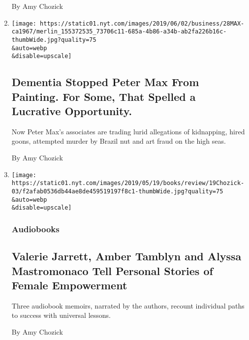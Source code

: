 \begin{enumerate}
  By Amy Chozick
\item
  \href{/2019/05/28/business/peter-max-dementia-cruise-ship-auctions.html}{}

  \texttt{[image: https://static01.nyt.com/images/2019/06/02/business/28MAX-ca1967/merlin\_155372535\_73706c11-685a-4b86-a34b-ab2fa226b16c-thumbWide.jpg?quality=75\\\&auto=webp\\\&disable=upscale]}

  \hypertarget{dementia-stopped-peter-max-from-painting-for-some-that-spelled-a-lucrative-opportunity}{%
  \subsection{Dementia Stopped Peter Max From Painting. For Some, That
  Spelled a Lucrative
  Opportunity.}\label{dementia-stopped-peter-max-from-painting-for-some-that-spelled-a-lucrative-opportunity}}

  Now Peter Max's associates are trading lurid allegations of
  kidnapping, hired goons, attempted murder by Brazil nut and art fraud
  on the high seas.

  By Amy Chozick
\item
  \href{/2019/04/26/books/review/valerie-jarrett-finding-my-voice-audiobook-memoirs.html}{}

  \texttt{[image: https://static01.nyt.com/images/2019/05/19/books/review/19Chozick-03/f2afab0536db44ae8de459519197f8c1-thumbWide.jpg?quality=75\\\&auto=webp\\\&disable=upscale]}

  \hypertarget{audiobooks}{%
  \subsubsection{Audiobooks}\label{audiobooks}}

  \hypertarget{valerie-jarrett-amber-tamblyn-and-alyssa-mastromonaco-tell-personal-stories-of-female-empowerment}{%
  \subsection{Valerie Jarrett, Amber Tamblyn and Alyssa Mastromonaco
  Tell Personal Stories of Female
  Empowerment}\label{valerie-jarrett-amber-tamblyn-and-alyssa-mastromonaco-tell-personal-stories-of-female-empowerment}}

  Three audiobook memoirs, narrated by the authors, recount individual
  paths to success with universal lessons.

  By Amy Chozick
\end{enumerate}

